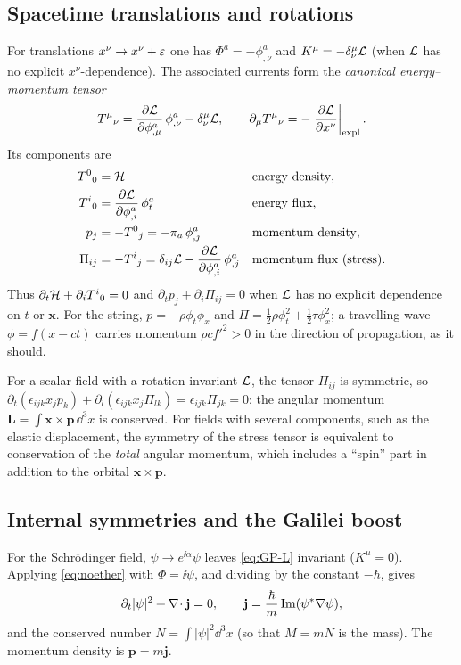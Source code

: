 \subsection{Spacetime translations and rotations}

For translations $x^\nu\to x^\nu+\varepsilon$ one has $\Phi^a=-\phi^a_{,\nu}$ and
$K^\mu=-\delta^\mu_\nu\mathcal{L}$ (when $\mathcal{L}$ has no explicit $x^\nu$-dependence).
The associated currents form the \emph{canonical energy--momentum tensor}
\begin{equation}
  T^\mu{}_\nu=\frac{\partial \mathcal{L}}{\partial \phi^a_{,\mu}}\,\phi^a_{,\nu}-\delta^\mu_\nu\mathcal{L},
  \qquad
  \partial_\mu T^\mu{}_\nu=-\left.\frac{\partial \mathcal{L}}{\partial x^\nu}\right|_{\rm expl}.
\end{equation}
Its components are
\begin{align}
  T^0{}_0&=\mathcal{H} &&\text{energy density},\nonumber\\
  T^i{}_0&=\frac{\partial \mathcal{L}}{\partial \phi^a_{,i}}\,\phi^a_t &&\text{energy flux},\nonumber\\
  p_j&=-T^0{}_j=-\pi_a\,\phi^a_{,j} &&\text{momentum density},\nonumber\\
  \Pi_{ij}&=-T^i{}_j=\delta_{ij}\mathcal{L}-\frac{\partial \mathcal{L}}{\partial \phi^a_{,i}}\,\phi^a_{,j} &&\text{momentum flux (stress)}.\nonumber
\end{align}
Thus $\partial_t\mathcal{H}+\partial_iT^i{}_0=0$ and $\partial_tp_j+\partial_i\Pi_{ij}=0$ when
$\mathcal{L}$ has no explicit dependence on $t$ or $\mathbf{x}$. For the string, $p=-\rho\phi_t\phi_x$ and
$\Pi=\tfrac12\rho\phi_t^2+\tfrac12\tau\phi_x^2$; a travelling wave $\phi=f(x-ct)$ carries momentum
$\rho c f'^2>0$ in the direction of propagation, as it should.

For a scalar field with a rotation-invariant $\mathcal{L}$, the tensor $\Pi_{ij}$ is symmetric, so
$\partial_t(\epsilon_{ijk}x_jp_k)+\partial_l(\epsilon_{ijk}x_j\Pi_{lk})=\epsilon_{ijk}\Pi_{jk}=0$: the angular
momentum $\mathbf{L}=\int\mathbf{x}\times\mathbf{p}\,\dd^3x$ is conserved. For
fields with several components, such as the elastic displacement, the symmetry of
the stress tensor is equivalent to conservation of the \emph{total} angular momentum, which includes a
``spin'' part in addition to the orbital $\mathbf{x}\times\mathbf{p}$.

\subsection{Internal symmetries and the Galilei boost}

For the Schr\"odinger field, $\psi\to e^{\ii\alpha}\psi$ leaves \eqref{eq:GP-L} invariant
($K^\mu=0$). Applying \eqref{eq:noether} with $\Phi=\ii\psi$, and dividing by the
constant $-\hbar$, gives
\begin{equation}
  \partial_t|\psi|^2+\nabla\!\cdot\mathbf{j}=0,\qquad
  \mathbf{j}=\frac{\hbar}{m}\operatorname{Im}(\psi^*\nabla\psi),
\end{equation}
and the conserved number $N=\int|\psi|^2\dd^3x$ (so that $M=mN$ is the mass).
The momentum density is $\mathbf{p}=m\mathbf{j}$.

